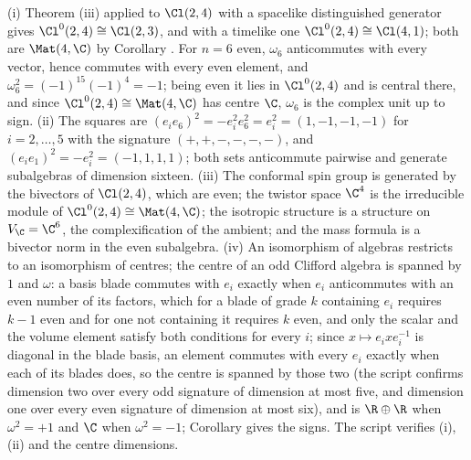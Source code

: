 (i) Theorem (iii) applied to $\Cl(2,4)$ with a spacelike distinguished generator gives $\Cl^{0}(2,4) \cong \Cl(2,3)$, and with a timelike one $\Cl^{0}(2,4) \cong \Cl(4,1)$; both are $\Mat(4,\C)$ by Corollary . For $n = 6$ even, $\omega_{6}$ anticommutes with every vector, hence commutes with every even element, and $\omega_{6}^{2} = (-1)^{15}(-1)^{4} = -1$; being even it lies in $\Cl^{0}(2,4)$ and is central there, and since $\Cl^{0}(2,4) \cong \Mat(4,\C)$ has centre $\C$, $\omega_{6}$ is the complex unit up to sign. (ii) The squares are $(e_{i}e_{6})^{2} = -e_{i}^{2}e_{6}^{2} = e_{i}^{2} = (1, -1, -1, -1)$ for $i = 2, \ldots, 5$ with the signature $(+,+,-,-,-,-)$, and $(e_{i}e_{1})^{2} = -e_{i}^{2} = (-1, 1, 1, 1)$; both sets anticommute pairwise and generate subalgebras of dimension sixteen. (iii) The conformal spin group is generated by the bivectors of $\Cl(2,4)$, which are even; the twistor space $\C^{4}$ is the irreducible module of $\Cl^{0}(2,4) \cong \Mat(4,\C)$; the isotropic structure is a structure on $V_{\C} = \C^{6}$, the complexification of the ambient; and the mass formula is a bivector norm in the even subalgebra. (iv) An isomorphism of algebras restricts to an isomorphism of centres; the centre of an odd Clifford algebra is spanned by $1$ and $\omega$: a basis blade commutes with $e_{i}$ exactly when $e_{i}$ anticommutes with an even number of its factors, which for a blade of grade $k$ containing $e_{i}$ requires $k - 1$ even and for one not containing it requires $k$ even, and only the scalar and the volume element satisfy both conditions for every $i$; since $x \mapsto e_{i}xe_{i}^{-1}$ is diagonal in the blade basis, an element commutes with every $e_{i}$ exactly when each of its blades does, so the centre is spanned by those two (the script confirms dimension two over every odd signature of dimension at most five, and dimension one over every even signature of dimension at most six), and is $\R \oplus \R$ when $\omega^{2} = +1$ and $\C$ when $\omega^{2} = -1$; Corollary  gives the signs. The script verifies (i), (ii) and the centre dimensions.
